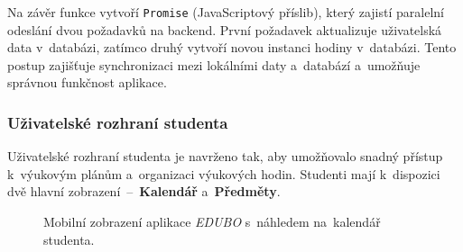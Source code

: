 \documentclass[male,czech,api_bc]{kitheses}
\begin{document}
Na závěr funkce vytvoří \texttt{Promise} (JavaScriptový příslib), který zajistí paralelní odeslání dvou požadavků na backend. První požadavek aktualizuje uživatelská data v~databázi, zatímco druhý vytvoří novou instanci hodiny v~databázi. Tento postup zajišťuje synchronizaci mezi lokálními daty a~databází a~umožňuje správnou funkčnost aplikace.

\subsubsection{Uživatelské rozhraní studenta}

Uživatelské rozhraní studenta je navrženo tak, aby umožňovalo snadný přístup k~výukovým plánům a~organizaci výukových hodin. Studenti mají k~dispozici dvě hlavní zobrazení~--~\textbf{Kalendář} a~\textbf{Předměty}.

\begin{figure}[H]
	\centering
	\caption{Mobilní zobrazení aplikace \textit{EDUBO} s~náhledem na~kalendář studenta.}
	\label{fig:edubo-5}
\end{figure}
\end{document}
